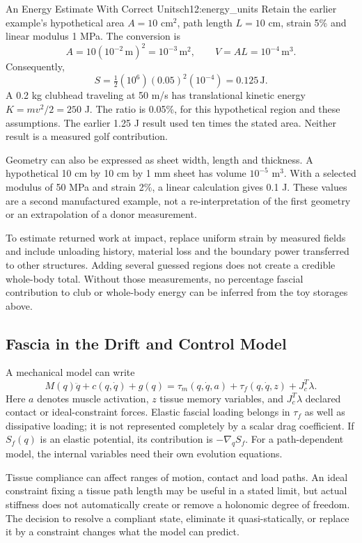 \begin{example}{An Energy Estimate With Correct Units}{ch12:energy_units}
Retain the earlier example's hypothetical area $A=10$ cm$^2$, path length $L=10$ cm, strain 5\% and linear modulus 1 MPa. The conversion is
\[
A=10(10^{-2}\,\mathrm m)^2=10^{-3}\,\mathrm m^2,
\qquad V=AL=10^{-4}\,\mathrm m^3.
\]
Consequently,
\[
S=\tfrac12(10^6)(0.05)^2(10^{-4})=0.125\,\mathrm J.
\]
A 0.2 kg clubhead traveling at 50 m/s has translational kinetic energy $K=mv^2/2=250$ J. The ratio is 0.05\%, for this hypothetical region and these assumptions. The earlier 1.25 J result used ten times the stated area. Neither result is a measured golf contribution.

Geometry can also be expressed as sheet width, length and thickness. A hypothetical 10 cm by 10 cm by 1 mm sheet has volume $10^{-5}$ m$^3$. With a selected modulus of 50 MPa and strain 2\%, a linear calculation gives 0.1 J. These values are a second manufactured example, not a re-interpretation of the first geometry or an extrapolation of a donor measurement.

To estimate returned work at impact, replace uniform strain by measured fields and include unloading history, material loss and the boundary power transferred to other structures. Adding several guessed regions does not create a credible whole-body total. Without those measurements, no percentage fascial contribution to club or whole-body energy can be inferred from the toy storages above.
\end{example}

\subsection{Fascia in the Drift and Control Model}

A mechanical model can write
\[
M(q)\ddot q+c(q,\dot q)+g(q)
=\tau_m(q,\dot q,a)+\tau_f(q,\dot q,z)+J_c^T\lambda.
\]
Here $a$ denotes muscle activation, $z$ tissue memory variables, and $J_c^T\lambda$ declared contact or ideal-constraint forces. Elastic fascial loading belongs in $\tau_f$ as well as dissipative loading; it is not represented completely by a scalar drag coefficient. If $S_f(q)$ is an elastic potential, its contribution is $-\nabla_q S_f$. For a path-dependent model, the internal variables need their own evolution equations.

Tissue compliance can affect ranges of motion, contact and load paths. An ideal constraint fixing a tissue path length may be useful in a stated limit, but actual stiffness does not automatically create or remove a holonomic degree of freedom. The decision to resolve a compliant state, eliminate it quasi-statically, or replace it by a constraint changes what the model can predict.

